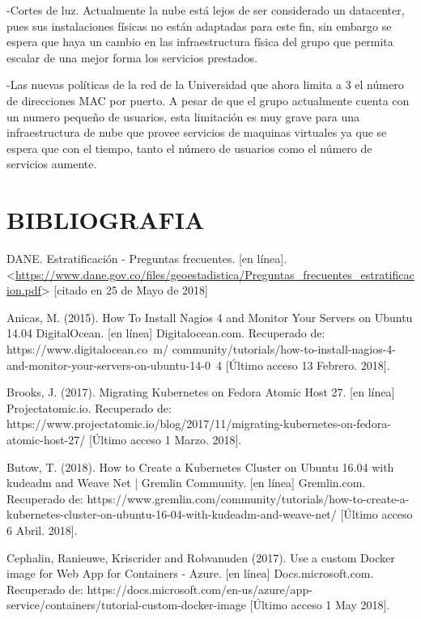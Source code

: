     -Cortes de luz. Actualmente la nube está lejos de ser considerado un datacenter, pues sus instalaciones físicas no están adaptadas para este fin, sin embargo se espera que haya un cambio en las infraestructura física del grupo que permita escalar de una mejor forma los servicios prestados.
    
    -Las nuevas políticas de la red de la Universidad que ahora limita a 3 el número de direcciones MAC por puerto. A pesar de que el grupo actualmente cuenta con un numero pequeño de usuarios, esta limitación es muy grave para una infraestructura de nube que provee servicios de maquinas virtuales ya que se espera que con el tiempo, tanto el número de usuarios como el número de servicios aumente.
    
    


    
\newpage\chapter*{BIBLIOGRAFIA}

DANE. Estratificación - Preguntas frecuentes. [en línea]. 
<\url{https://www.dane.gov.co/files/geoestadistica/Preguntas_frecuentes_estratificacion.pdf}> [citado en 25 de Mayo de 2018]
    

     Anicas, M. (2015). How To Install Nagios 4 and Monitor Your Servers on Ubuntu 14.04 DigitalOcean. [en línea] Digitalocean.com. Recuperado de: https://www.digitalocean.co\ m/
community/tutorials/how-to-install-nagios-4-and-monitor-your-servers-on-ubuntu-14-0\ 4 [Último acceso 13 Febrero. 2018].

Brooks, J. (2017). Migrating Kubernetes on Fedora Atomic Host 27. [en línea] Projectatomic.io. Recuperado de: https://www.projectatomic.io/blog/2017/11/migrating-kubernetes-on-fedora-atomic-host-27/ [Último acceso 1 Marzo. 2018].

Butow, T. (2018). How to Create a Kubernetes Cluster on Ubuntu 16.04 with kudeadm and Weave Net | Gremlin Community. [en línea] Gremlin.com. Recuperado de: https://www.gremlin.com/community/tutorials/how-to-create-a-kubernetes-cluster-on-ubuntu-16-04-with-kudeadm-and-weave-net/ [Último acceso 6 Abril. 2018].

Cephalin, Ranieuwe, Kriscrider and Robvanuden (2017). Use a custom Docker image for Web App for Containers - Azure. [en línea] Docs.microsoft.com. Recuperado de: https://docs.microsoft.com/en-us/azure/app-service/containers/tutorial-custom-docker-image [Último acceso 1 May 2018].

